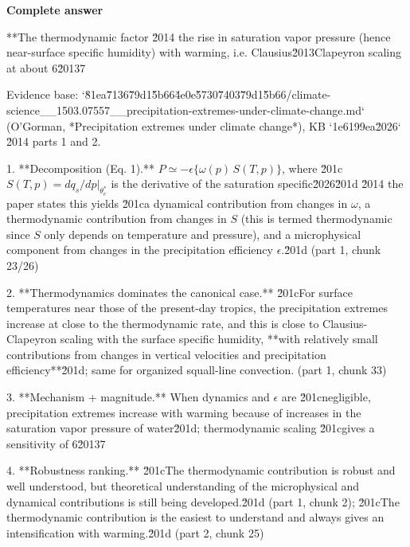 \documentclass[10pt]{article}
\begin{document}
\textbf{Complete answer}
\begin{AnswerText}
**The thermodynamic factor \u2014 the rise in saturation vapor pressure (hence near-surface specific humidity) with warming, i.e. Clausius\u2013Clapeyron scaling at about 6\u20137 %

Evidence base: `\u81ea\u7136\u79d1\u5b66\u4e0e\u5730\u7403\u79d1\u5b66/climate-science__1503.07557__precipitation-extremes-under-climate-change.md` (O'Gorman, *Precipitation extremes under climate change*), KB `1e6199ea\u2026` \u2014 parts 1 and 2.

1. **Decomposition (Eq. 1).** $P \simeq -\epsilon\{\omega(p)\,S(T,p)\}$, where \u201c$S(T,p)=dq_s/dp|_{\theta_e^*}$ is the derivative of the saturation specific\u2026\u201d \u2014 the paper states this yields \u201ca dynamical contribution from changes in $\omega$, a thermodynamic contribution from changes in $S$ (this is termed thermodynamic since $S$ only depends on temperature and pressure), and a microphysical component from changes in the precipitation efficiency $\epsilon$.\u201d (part 1, chunk 23/26)

2. **Thermodynamics dominates the canonical case.** \u201cFor surface temperatures near those of the present-day tropics, the precipitation extremes increase at close to the thermodynamic rate, and this is close to Clausius-Clapeyron scaling with the surface specific humidity, **with relatively small contributions from changes in vertical velocities and precipitation efficiency**\u201d; same for organized squall-line convection. (part 1, chunk 33)

3. **Mechanism + magnitude.** When dynamics and $\epsilon$ are \u201cnegligible, precipitation extremes increase with warming because of increases in the saturation vapor pressure of water\u201d; thermodynamic scaling \u201cgives a sensitivity of 6\u20137 %

4. **Robustness ranking.** \u201cThe thermodynamic contribution is robust and well understood, but theoretical understanding of the microphysical and dynamical contributions is still being developed.\u201d (part 1, chunk 2); \u201cThe thermodynamic contribution is the easiest to understand and always gives an intensification with warming.\u201d (part 2, chunk 25)


\end{AnswerText}
\end{document}
